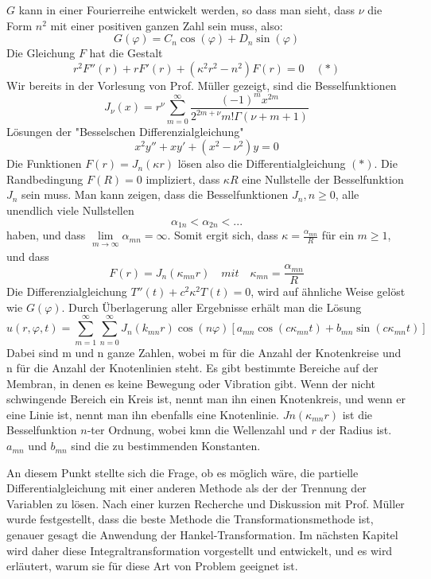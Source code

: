 $G$ kann in einer Fourierreihe entwickelt werden, so dass man sieht, dass $\nu$ die Form $n^2$ mit einer positiven ganzen Zahl sein muss, also:
\begin{equation*}
 G(\varphi) = C_n \cos(\varphi) + D_n \sin(\varphi)
\end{equation*}
Die Gleichung $F$ hat die Gestalt
\begin{equation*}
	r^2F''(r) + rF'(r) + (\kappa^2 r^2 - n^2)F(r) = 0 \quad (*)
\end{equation*}
Wir bereits in der Vorlesung von Prof. Müller gezeigt, sind die Besselfunktionen
\begin{equation*}
	J_{\nu}(x) = r^\nu \displaystyle\sum_{m=0}^{\infty} \frac{(-1)^m x^{2m}}{2^{2m+\nu}m! \Gamma (\nu + m+1)}
\end{equation*}
Lösungen der "Besselschen Differenzialgleichung"
\begin{equation*}
	x^2 y'' + xy' + (x^2 - \nu^2)y = 0
\end{equation*}
Die Funktionen $F(r) = J_n(\kappa r)$ lösen also die Differentialgleichung $(*)$. Die
Randbedingung $F(R)=0$ impliziert, dass $\kappa R$ eine Nullstelle der Besselfunktion
$J_n$ sein muss. Man kann zeigen, dass die Besselfunktionen $J_n, n \geq 0$, alle unendlich
viele Nullstellen
\begin{equation*}
	\alpha_{1n} < \alpha_{2n} < ...
\end{equation*}
haben, und dass $\underset{\substack{m\to\infty}}{\text{lim}} \alpha_{mn}=\infty$. Somit ergit sich, dass $\kappa = \frac{\alpha_{mn}}{R}$ für ein $m\geq 1$, und dass
\begin{equation*}
	F(r) = J_n (\kappa_{mn}r) \quad mit \quad \kappa_{mn}=\frac{\alpha_{mn}}{R}
\end{equation*}
Die Differenzialgleichung $T''(t) + c^2\kappa^2T(t) = 0$, wird auf ähnliche Weise gelöst wie $G(\varphi)$. Durch Überlagerung aller Ergebnisse erhält man die Lösung
\begin{equation}
	u(r, \varphi, t) = \displaystyle\sum_{m=1}^{\infty}\displaystyle\sum_{n=0}^{\infty} J_n (k_{mn}r)\cos(n\varphi)[a_{mn}\cos(c \kappa_{mn} t)+b_{mn}\sin(c \kappa_{mn} t)]
\end{equation}
Dabei sind m und n ganze Zahlen, wobei m für die Anzahl der Knotenkreise und n
für die Anzahl der Knotenlinien steht. Es gibt bestimmte Bereiche auf der Membran, in denen es keine Bewegung oder Vibration gibt. Wenn der nicht schwingende Bereich ein Kreis ist, nennt man ihn einen Knotenkreis, und wenn er eine Linie ist, nennt man ihn ebenfalls eine Knotenlinie. $Jn(\kappa_{mn}r)$ ist die Besselfunktion $n$-ter Ordnung, wobei kmn die Wellenzahl und $r$ der Radius ist. $a_{mn}$ und $b_{mn}$ sind die zu bestimmenden Konstanten.

An diesem Punkt stellte sich die Frage, ob es möglich wäre, die partielle Differentialgleichung mit einer anderen Methode als der der Trennung der Variablen zu lösen. Nach einer kurzen Recherche und Diskussion mit Prof. Müller wurde festgestellt, dass die beste Methode die Transformationsmethode ist, genauer gesagt die Anwendung der Hankel-Transformation. Im nächsten Kapitel wird daher diese Integraltransformation vorgestellt und entwickelt, und es wird erläutert, warum sie für diese Art von Problem geeignet ist.
